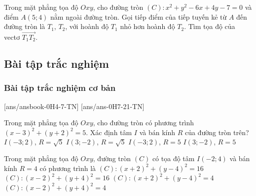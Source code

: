 \begin{bt}%
	Trong mặt phẳng tọa độ $Oxy$, cho đường tròn $(C): x^2+y^2-6x+4y-7=0$ và điểm $A(5; 4)$ nằm ngoài đường tròn. Gọi tiếp điểm của tiếp tuyến kẻ từ $A$ đến đường tròn là $T_1$, $T_2$, với hoành độ $T_1$ nhỏ hơn hoành độ $T_2$. Tìm tọa độ của vectơ $\overrightarrow{T_1T_2}$. 
\end{bt}

\subsection{Bài tập trắc nghiệm}
\subsubsection{Bài tập trắc nghiệm cơ bản}
[ans/ansbook-0H4-7-TN]
[ans/ans-0H7-21-TN]
\begin{ex}%
	Trong mặt phẳng tọa độ $Oxy$, cho đường tròn có phương trình $(x-3)^2+(y+2)^2=5$. Xác định tâm $I$ và bán kính $R$ của đường tròn trên?
	\choice
	{$I(-3;2)$, $R = \sqrt{5}$}
	{\True $I(3;-2)$, $R = \sqrt{5}$}
	{$I(-3;2)$, $R = 5$}
	{$I(3;-2)$, $R =5$}
\end{ex}

\begin{ex}%
	Trong mặt phẳng tọa độ $Oxy$, đường tròn $(C)$ có tọa độ tâm $I(-2 ; 4)$ và bán kính $R = 4$ có phương trình là 
	\choice
	{\True $(C)\colon (x + 2)^2 + (y - 4)^2 = 16$}
	{$(C)\colon (x - 2)^2 + (y + 4)^2 = 16$}
	{$(C)\colon (x + 2)^2 + (y - 4)^2 = 4$}
	{$(C)\colon (x - 2)^2 + (y + 4)^2 = 4$}
\end{ex}

